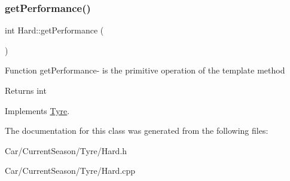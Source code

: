 \subsubsection{\texorpdfstring{get\+Performance()}{getPerformance()}}
{\footnotesize\ttfamily int Hard\+::get\+Performance (\begin{DoxyParamCaption}{ }\end{DoxyParamCaption})\hspace{0.3cm}{\ttfamily [virtual]}}

Function get\+Performance-\/ is the primitive operation of the template method \begin{DoxyReturn}{Returns}
int 
\end{DoxyReturn}


Implements \hyperlink{classTyre_a039a0e53d35fb8bb9301e05b13af1478}{Tyre}.



The documentation for this class was generated from the following files\+:\begin{DoxyCompactItemize}
\item 
Car/\+Current\+Season/\+Tyre/Hard.\+h\item 
Car/\+Current\+Season/\+Tyre/Hard.\+cpp\end{DoxyCompactItemize}
